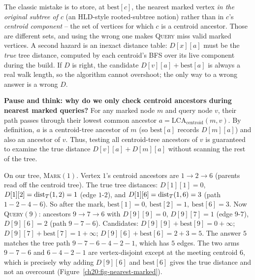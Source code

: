 \begin{trapbox}
The classic mistake is to store, at $\mathrm{best}[c]$, the nearest marked vertex
\emph{in the original subtree of $c$} (an HLD-style rooted-subtree notion) rather
than in $c$'s \emph{centroid component} -- the set of vertices for which $c$ is a
centroid ancestor. Those are different sets, and using the wrong one makes
\textsc{Query} miss valid marked vertices. A second hazard is an inexact distance
table: $D[x][a]$ must be the \emph{true} tree distance, computed by each centroid's
BFS over its live component during the build. If $D$ is right, the candidate
$D[v][a]+\mathrm{best}[a]$ is always a real walk length, so the algorithm cannot
overshoot; the only way to a wrong answer is a wrong $D$.
\end{trapbox}

\begin{recoverybox}
\textbf{Pause and think: why do we only check centroid ancestors during nearest marked queries?}
For any marked node $m$ and query node $v$, their path passes through their lowest common ancestor $a = \mathrm{LCA}_{\text{centroid}}(m,v)$. By definition, $a$ is a centroid-tree ancestor of $m$ (so $\mathrm{best}[a]$ records $D[m][a]$) and also an ancestor of $v$. Thus, testing all centroid-tree ancestors of $v$ is guaranteed to examine the true distance $D[v][a] + D[m][a]$ without scanning the rest of the tree.
\end{recoverybox}

\begin{labbox}
On our tree, \textsc{Mark}$(1)$. Vertex $1$'s centroid ancestors are
$1\to2\to6$ (parents read off the centroid tree). The true tree distances:
$D[1][1]=0$, $D[1][2]=\operatorname{dist}_T(1,2)=1$ (edge $1$-$2$), and $D[1][6]=\operatorname{dist}_T(1,6)=3$
(path $1\!-\!2\!-\!4\!-\!6$). So after the mark,
$\mathrm{best}[1]=0,\ \mathrm{best}[2]=1,\ \mathrm{best}[6]=3$. Now
\textsc{Query}$(9)$: ancestors $9\to7\to6$ with $D[9][9]=0$, $D[9][7]=1$ (edge
$9$-$7$), $D[9][6]=2$ (path $9\!-\!7\!-\!6$). Candidates:
$D[9][9]+\mathrm{best}[9]=0+\infty$; $D[9][7]+\mathrm{best}[7]=1+\infty$;
$D[9][6]+\mathrm{best}[6]=2+3=5$. The answer $5$ matches the tree path
$9\!-\!7\!-\!6\!-\!4\!-\!2\!-\!1$, which has $5$ edges. The two arms
$9\!-\!7\!-\!6$ and $6\!-\!4\!-\!2\!-\!1$ are vertex-disjoint except at the meeting
centroid $6$, which is precisely why adding $D[9][6]$ and $\mathrm{best}[6]$ gives
the true distance and not an overcount (Figure~\ref{ch20:fig-nearest-marked}).
\end{labbox}

